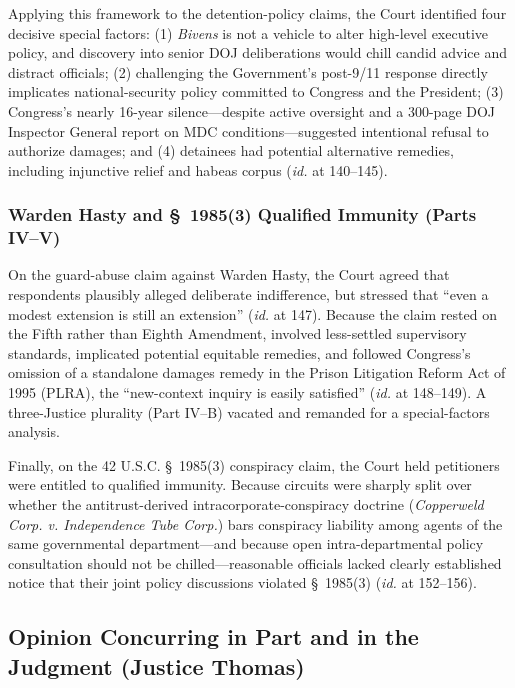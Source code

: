 \documentclass[12pt]{article}
\begin{document}
Applying this framework to the detention-policy claims, the Court identified four decisive special factors: (1) \textit{Bivens} is not a vehicle to alter high-level executive policy, and discovery into senior DOJ deliberations would chill candid advice and distract officials; (2) challenging the Government's post-9/11 response directly implicates national-security policy committed to Congress and the President; (3) Congress's nearly 16-year silence---despite active oversight and a 300-page DOJ Inspector General report on MDC conditions---suggested intentional refusal to authorize damages; and (4) detainees had potential alternative remedies, including injunctive relief and habeas corpus (\textit{id.} at 140--145).

\subsubsection{Warden Hasty and \S~1985(3) Qualified Immunity (Parts IV--V)}

On the guard-abuse claim against Warden Hasty, the Court agreed that respondents plausibly alleged deliberate indifference, but stressed that ``even a modest extension is still an extension'' (\textit{id.} at 147). Because the claim rested on the Fifth rather than Eighth Amendment, involved less-settled supervisory standards, implicated potential equitable remedies, and followed Congress's omission of a standalone damages remedy in the Prison Litigation Reform Act of 1995 (PLRA), the ``new-context inquiry is easily satisfied'' (\textit{id.} at 148--149). A three-Justice plurality (Part IV--B) vacated and remanded for a special-factors analysis.

Finally, on the 42 U.S.C. \S~1985(3) conspiracy claim, the Court held petitioners were entitled to qualified immunity. Because circuits were sharply split over whether the antitrust-derived intracorporate-conspiracy doctrine (\textit{Copperweld Corp. v. Independence Tube Corp.}) bars conspiracy liability among agents of the same governmental department---and because open intra-departmental policy consultation should not be chilled---reasonable officials lacked clearly established notice that their joint policy discussions violated \S~1985(3) (\textit{id.} at 152--156).

\subsection{Opinion Concurring in Part and in the Judgment (Justice Thomas)}
\end{document}
